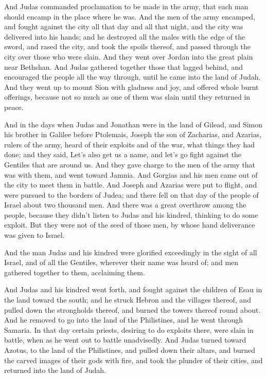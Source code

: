 {And Judas commanded proclamation to be made in the army, that each man should encamp in the place where he was.
And the men of the army encamped, and fought against the city all that day and all that night, and the city was delivered into his hands;
and he destroyed all the males with the edge of the sword, and rased the city, and took the spoils thereof, and passed through the city over those who were slain.
And they went over Jordan into the great plain near Bethshan.
And Judas gathered together those that lagged behind, and encouraged the people all the way through, until he came into the land of Judah.
And they went up to mount Sion with gladness and joy, and offered whole burnt offerings, because not so much as one of them was slain until they returned in peace.
\par }{\PP {}And in the days when Judas and Jonathan were in the land of Gilead, and Simon his brother in Galilee before Ptolemais,
Joseph the son of Zacharias, and Azarias, rulers of the army, heard of their exploits and of the war, what things they had done;
and they said, Let’s also get us a name, and let’s go fight against the Gentiles that are around us.
And they gave charge to the men of the army that was with them, and went toward Jamnia.
And Gorgias and his men came out of the city to meet them in battle.
And Joseph and Azarias were put to flight, and were pursued to the borders of Judea; and there fell on that day of the people of Israel about two thousand men.
And there was a great overthrow among the people, because they didn’t listen to Judas and his kindred, thinking to do some exploit.
But they were not of the seed of those men, by whose hand deliverance was given to Israel.
\par }{\PP {}And the man Judas and his kindred were glorified exceedingly in the sight of all Israel, and of all the Gentiles, wherever their name was heard of;
and men gathered together to them, acclaiming them.
\par }{\PP {}And Judas and his kindred went forth, and fought against the children of Esau in the land toward the south; and he struck Hebron and the
 villages thereof, and pulled down the strongholds thereof, and burned the towers thereof round about.
And he removed to go into the land of the
 Philistines, and he went through
 Samaria.
In that day certain priests, desiring to do exploits there, were slain in battle, when as
 he went out to battle unadvisedly.
And Judas turned toward Azotus, to the land of the
 Philistines, and pulled down their altars, and burned the carved images of their gods with fire, and took the plunder of their cities, and returned into the land of Judah.

}
